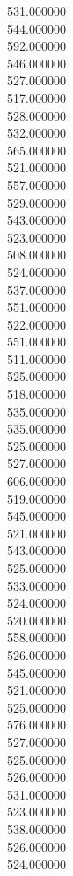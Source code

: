 531.000000\\
544.000000\\
592.000000\\
546.000000\\
527.000000\\
517.000000\\
528.000000\\
532.000000\\
565.000000\\
521.000000\\
557.000000\\
529.000000\\
543.000000\\
523.000000\\
508.000000\\
524.000000\\
537.000000\\
551.000000\\
522.000000\\
551.000000\\
511.000000\\
525.000000\\
518.000000\\
535.000000\\
535.000000\\
525.000000\\
527.000000\\
606.000000\\
519.000000\\
545.000000\\
521.000000\\
543.000000\\
525.000000\\
533.000000\\
524.000000\\
520.000000\\
558.000000\\
526.000000\\
545.000000\\
521.000000\\
525.000000\\
576.000000\\
527.000000\\
525.000000\\
526.000000\\
531.000000\\
523.000000\\
538.000000\\
526.000000\\
524.000000\\
